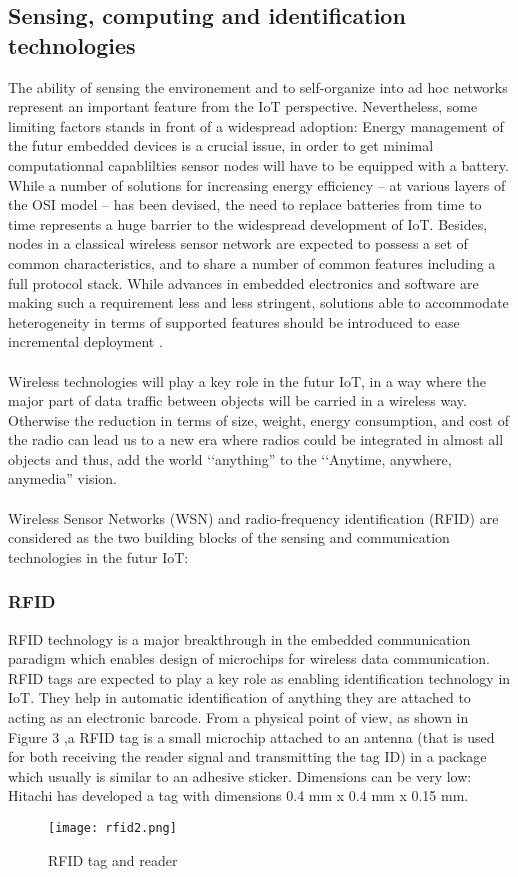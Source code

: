 \documentclass[10pt, twocolumn]{article}
\begin{document}
\subsection{Sensing, computing and identification technologies} 
The ability of sensing the environement and to self-organize into ad hoc networks represent an important feature from the IoT perspective. Nevertheless, some limiting factors stands in front of a widespread adoption:
Energy management of the futur embedded devices is a crucial issue, in order to get minimal computationnal capablilties sensor nodes will have to be equipped with a battery. While a number of solutions for increasing energy efficiency – at various layers of the OSI model – has been devised, the need to replace batteries from time to time represents a huge barrier to the widespread development of IoT. Besides, nodes in a classical wireless sensor network are expected to possess a set of common characteristics, and to share a number of common features including a full protocol stack. While advances in embedded electronics and software are making such a requirement less and less stringent, solutions able to accommodate heterogeneity in terms of supported features should be introduced to ease incremental deployment \cite{ref2}.
\paragraph{}
Wireless technologies will play a key role in the futur IoT, in a way where the major part of data traffic between objects will be carried in a wireless way. Otherwise the reduction in terms of size, weight, energy consumption, and cost of the radio can lead us to a new era where radios could be integrated in almost all objects and thus, add the world ‘‘anything” to the ‘‘Anytime, anywhere, anymedia” vision.
\paragraph{}
Wireless Sensor Networks (WSN) and radio-frequency identification (RFID) are considered as the two building blocks of the sensing and communication technologies in the futur IoT:
\subsubsection{RFID}
RFID technology is a major breakthrough in the embedded communication paradigm which enables design of microchips for wireless data communication. RFID tags are expected to play a key role as enabling identification technology in IoT. They help in automatic identification of anything they are attached to acting as an electronic barcode.
From a physical point of view, as shown in Figure 3 ,a RFID tag is a small microchip attached to an antenna (that is used for both receiving the reader signal and transmitting the tag ID) in a package which usually is similar to an adhesive sticker. Dimensions can be very low: Hitachi has developed a tag with dimensions 0.4 mm x 0.4 mm x 0.15 mm.
\begin{figure}
\begin{center}
\texttt{[image: rfid2.png]}
\end{center}
\caption{RFID tag and reader}
\end{figure}
\end{document}
